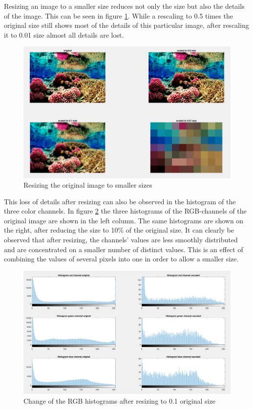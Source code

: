 \documentclass[11pt]{article}
\begin{document}
Resizing an image to a smaller size reduces not only the size but also the details of the image. This can be seen in figure \ref{fig:task5}. While a rescaling to 0.5 times the original size still shows most of the details of this particular image, after rescaling it to 0.01 size almost all details are lost.

\begin{figure}[!hbt]
  \includegraphics[width=\textwidth]{task5}
  \caption{Resizing the original image to smaller sizes}
  \label{fig:task5}
\end{figure}

This loss of details after resizing can also be observed in the histogram of the three color channels. In figure \ref{fig:task6} the three histograms of the RGB-channels of the original image are shown in the left column. The same histograms are shown on the right, after reducing the size to 10\% of the original size. It can clearly be observed that after resizing, the channels' values are less smoothly distributed and are concentrated on a smaller number of distinct values. This is an effect of combining the values of several pixels into one in order to allow a smaller size. 

\begin{figure}[!hbt]
  \includegraphics[width=\textwidth]{task6}
  \caption{Change of the RGB histograms after resizing to 0.1 original size}
  \label{fig:task6}
\end{figure}
\end{document}
